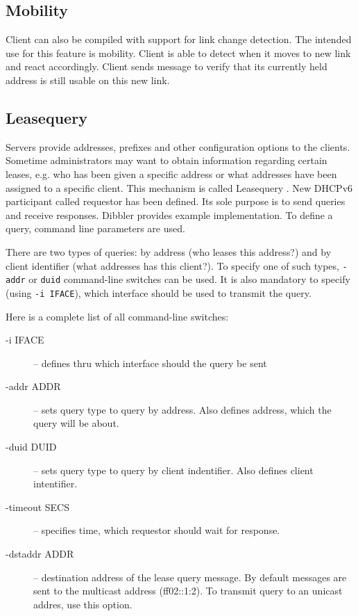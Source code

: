 \subsection{Mobility}
Client can also be compiled with support for link change detection.
The intended use for this feature is mobility. Client is able to
detect when it moves to new link and react accordingly. Client sends
 message to verify that its currently held address is
still usable on this new link.

\subsection{Leasequery}
\label{features-leasequery}
Servers provide addresses, prefixes and other configuration options to
the clients. Sometime administrators may want to obtain information
regarding certain leases, e.g. who has been given a specific address
or what addresses have been assigned to a specific client. This
mechanism is called Leasequery \cite{rfc5007}. New DHCPv6 participant
called requestor has been defined. Its sole purpose is to send queries
and receive responses. Dibbler provides example implementation. To
define a query, command line parameters are used. 

There are two types of queries: by address (who leases this address?)
and by client identifier (what addresses has this client?). To specify
one of such types, \verb+-addr+ or \verb+duid+ command-line switches
can be used. It is also mandatory to specify (using \verb+-i IFACE+),
which interface should be used to transmit the query.

Here is a complete list of all command-line switches:

\begin{description}
\item[-i IFACE] -- defines thru which interface should the query be sent
\item[-addr ADDR] -- sets query type to query by address. Also defines
  address, which the query will be about.
\item[-duid DUID] -- sets query type to query by client
  indentifier. Also defines client intentifier.
\item[-timeout SECS] -- specifies time, which requestor should wait
  for response.
\item[-dstaddr ADDR] -- destination address of the lease query
  message. By default messages are sent to the multicast address
  (ff02::1:2). To transmit query to an unicast addres, use this option.
\end{description}

